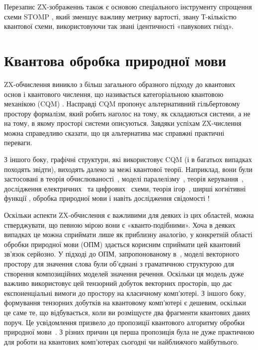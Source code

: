 \documentclass[11pt]{article}
\theoremstyle{definition}
\begin{document}
{Перезапис ZX-зображеннь також є основою спеціального інструменту спрощення схеми STOMP \cite{de2020fast}, який зменшує важливу метрику вартості, звану Т-кількістю квантової схеми, використовуючи так звані ідентичності «павукових гнізд».


\section{Квантова обробка природної мови}\label{sec:QNLP}%

ZX-обчислення виникло з більш загального образного підходу до квантових основ і квантового числення, що називається категоріальною квантовою механікою (CQM) \cite{AC1, Kindergarten}. Насправді CQM пропонує альтернативний гільбертовому простору формалізм, який робить наголос на тому, як складаються системи, а не на тому, в якому просторі системи описуються. Завдяки успіхам ZX-числення можна справедливо сказати, що ця альтернатива має справжні практичні переваги.

З іншого боку, графічні структури, які використовує CQM (і в багатьох випадках походять звідти), виходять далеко за межі квантової теорії. Наприклад, вони були застосовані в
теорія обчислюваності~\cite{pavlovic2013monoidal}, моделі паралелізму~\cite{Sobocinski:2010aa}, теорія керування~\cite{Baez2014a,Bonchi2015}, дослідження електричних~\cite{BaezFongElec} та цифрових~\cite{GhicaCircuit} схеми, теорія ігор~\cite{ghani2016compositional}, ширші когнітивні функції \cite{ConcSpacI}, обробка природної мови \cite{CSC, FrobMeanI} і навіть дослідження свідомості \cite{seanconscious, wangconscious}!

Оскільки аспекти ZX-обчислення є важливими для деяких із цих областей, можна стверджувати, що певною мірою вони є «кванто-подібними». Хоча в деяких випадках це можна сприймати лише як приблизну аналогію, у конкретній області обробки природної мови (ОПМ) здається корисним сприймати цей квантовий зв’язок серйозно. У підході до ОПМ, запропонованому в~\cite{CSC}, моделі векторного простору для значення слова були об’єднані з граматичною структурою для створення композиційних моделей значення речення. Оскільки ця модель дуже важливо використовує цей тензорний добуток векторних просторів, що дає експоненціальні вимоги до простору на класичному комп’ютері. З іншого боку, формування тензорних добутків на квантовому комп’ютері є дешевим, оскільки це саме те, що відбувається, коли ви розміщуєте два фрагменти квантових даних поруч. Це усвідомлення призвело до пропозиції квантового алгоритму обробки природної мови~\cite{WillC}. З різних причин ця перша пропозиція була не дуже практичною для роботи на квантових комп’ютерах сьогодні чи найближчого майбутнього.

}
\end{document}
